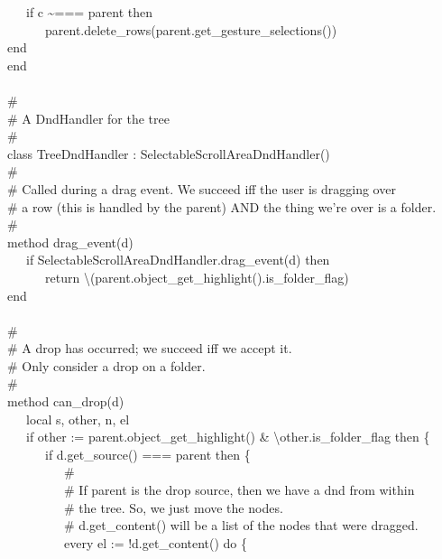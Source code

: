{\>   \ \ \ if c \~{}=== parent then \\
\>   \ \ \ \ \ \ parent.delete\_rows(parent.get\_gesture\_selections()) \\
\>   end \\
end \\
\ \\
\# \\
\# A DndHandler for the tree \\
\# \\
class TreeDndHandler : SelectableScrollAreaDndHandler() \\
\>   \# \\
\>   \# Called during a drag event. We succeed iff the user is dragging over \\
\>   \# a row (this is handled by the parent) AND the thing we're over is a folder. \\
\>   \# \\
\>   method drag\_event(d) \\
\>   \ \ \ if SelectableScrollAreaDndHandler.drag\_event(d) then \\
\>   \ \ \ \ \ \ return
{\textbackslash}(parent.object\_get\_highlight().is\_folder\_flag) \\
\>   end \\
\ \\
\>   \# \\
\>   \# A drop has occurred; we succeed iff we accept it. \\
\>   \# Only consider a drop on a folder. \\
\>   \# \\
\>   method can\_drop(d) \\
\>   \ \ \ local s, other, n, el \\
\>   \ \ \ if other := parent.object\_get\_highlight() \&
{\textbackslash}other.is\_folder\_flag then \{ \\
\>   \ \ \ \ \ \ if d.get\_source() === parent then \{ \\
\>   \ \ \ \ \ \ \ \ \ \# \\
\>   \ \ \ \ \ \ \ \ \ \# If parent is the drop source, then we have a dnd
                          from within \\
\>   \ \ \ \ \ \ \ \ \ \# the tree. So, we just move the nodes. \\
\>   \ \ \ \ \ \ \ \ \ \# d.get\_content() will be a list of the nodes
that were dragged. \\
\>   \ \ \ \ \ \ \ \ \ every el := !d.get\_content() do \{ \\
}
